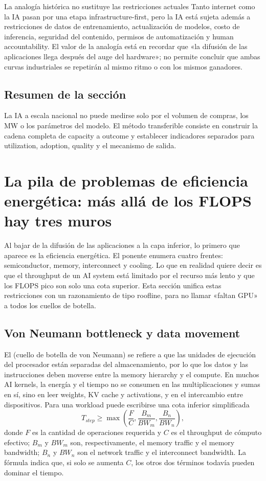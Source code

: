 \documentclass[a4paper]{article}
\begin{document}
\begin{warningbox}{La analogía histórica no sustituye las restricciones actuales}
Tanto internet como la IA pasan por una etapa infrastructure-first, pero la IA está sujeta además a restricciones de datos de entrenamiento, actualización de modelos, costo de inferencia, seguridad del contenido, permisos de automatización y human accountability. El valor de la analogía está en recordar que «la difusión de las aplicaciones llega después del auge del hardware»; no permite concluir que ambas curvas industriales se repetirán al mismo ritmo o con los mismos ganadores.
\end{warningbox}

\subsection{Resumen de la sección}

La IA a escala nacional no puede medirse solo por el volumen de compras, los MW o los parámetros del modelo. El método transferible consiste en construir la cadena completa de capacity a outcome y establecer indicadores separados para utilization, adoption, quality y el mecanismo de salida.
\section{La pila de problemas de eficiencia energética: más allá de los FLOPS hay tres muros}

Al bajar de la difusión de las aplicaciones a la capa inferior, lo primero que aparece es la eficiencia energética. El ponente enumera cuatro frentes: semiconductor, memory, interconnect y cooling. Lo que en realidad quiere decir es que el throughput de un AI system está limitado por el recurso más lento y que los FLOPS pico son solo una cota superior. Esta sección unifica estas restricciones con un razonamiento de tipo roofline, para no llamar «faltan GPU» a todos los cuellos de botella.

\subsection{Von Neumann bottleneck y data movement}

El  (cuello de botella de von Neumann) se refiere a que las unidades de ejecución del procesador están separadas del almacenamiento, por lo que los datos y las instrucciones deben moverse entre la memory hierarchy y el compute. En muchos AI kernels, la energía y el tiempo no se consumen en las multiplicaciones y sumas en sí, sino en leer weights, KV cache y activations, y en el intercambio entre dispositivos. Para una workload puede escribirse una cota inferior simplificada
\[
T_{step}\geq \max\left(\frac{F}{C},\frac{B_m}{BW_m},\frac{B_n}{BW_n}\right),
\]
donde $F$ es la cantidad de operaciones requerida y $C$ es el throughput de cómputo efectivo; $B_m$ y $BW_m$ son, respectivamente, el memory traffic y el memory bandwidth; $B_n$ y $BW_n$ son el network traffic y el interconnect bandwidth. La fórmula indica que, si solo se aumenta $C$, los otros dos términos todavía pueden dominar el tiempo.
\end{document}
